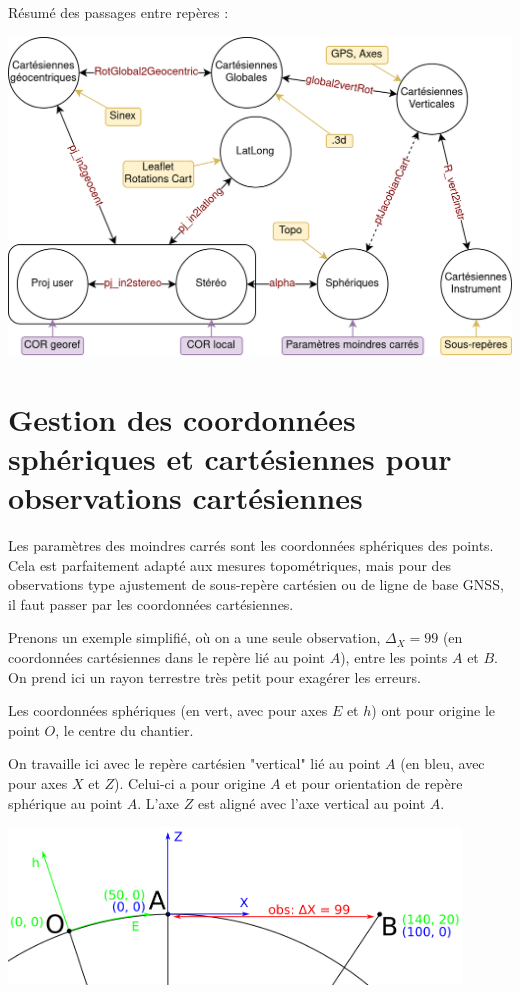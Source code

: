 \documentclass[french]{report}
\begin{document}
Résumé des passages entre repères :

\begin{center}
\includegraphics[width = 14cm]{images/all_frames}
\end{center}

\newpage

\section{Gestion des coordonnées sphériques et cartésiennes pour observations cartésiennes}

Les paramètres des moindres carrés sont les coordonnées sphériques des points.
Cela est parfaitement adapté aux mesures topométriques, mais pour des observations
type ajustement de sous-repère cartésien ou de ligne de base GNSS, il faut passer par les coordonnées cartésiennes.

Prenons un exemple simplifié, où on a une seule observation, $\Delta_X = 99$ (en coordonnées cartésiennes dans le repère lié au point $A$), entre les points $A$ et $B$. On prend ici un rayon terrestre très petit pour exagérer les erreurs.

Les coordonnées sphériques (en vert, avec pour axes $E$ et $h$) ont pour origine le point $O$, le centre du chantier.

On travaille ici avec le repère cartésien "vertical" lié au point $A$ (en bleu, avec pour axes $X$ et $Z$).
Celui-ci a pour origine $A$ et pour orientation de repère sphérique au point $A$. L'axe $Z$ est aligné avec l'axe vertical au point $A$.

\begin{center}
\includegraphics[width = 12cm]{images/cart_spher_obs}
\end{center}
\end{document}

